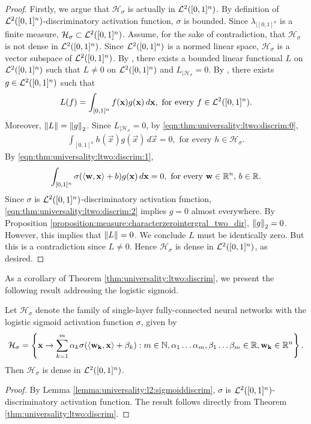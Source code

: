 \begin{proof}
Firstly, we argue that $\mathcal{H}_{\sigma}$ is actually in ${\mathcal {L}^2}([0,1]^n)$. By definition of ${\mathcal {L}^2}([0,1]^n)$-discriminatory activation function,
$\sigma$ is bounded. Since $\lambda_{|[0,1]^n}$ is a finite measure,  $\mathcal{H}_{\sigma} \subset {\mathcal {L}^2}([0,1]^n)$.
Assume, for the sake of contradiction, that  $\mathcal{H}_{\sigma}$ is not dense in ${\mathcal {L}^2}([0,1]^n)$. Since  ${\mathcal {L}^2}([0,1]^n)$ is a normed linear space, $\mathcal{H}_{\sigma}$ is a vector subspace of  ${\mathcal {L}^2}([0,1]^n)$.
By , there exists a bounded linear functional $L$ on ${\mathcal {L}^2}([0,1]^n)$ such that $L \neq 0$ on ${\mathcal {L}^2}([0,1]^n)$ and $L_{|\mathcal{H}_{\sigma}} = 0$. By , there exists $g \in {\mathcal {L}^2}([0,1]^n)$ such that \begin{align}
    \label{eqn:thm:universality:ltwo:discrim:0}
    L (f) = \int_{[0,1]^n} f(\mathbf{x}) g(\mathbf{x}) \, d\mathbf{x}, \text{ for every $f \in {\mathcal {L}^2}([0,1]^n)$}.
\end{align}
Moreover, $\left\lVert L\right\rVert = \left\lVert g\right\rVert_2$. Since $L_{|\mathcal{H}_{\sigma}} = 0$, by \ref{eqn:thm:universality:ltwo:discrim:0},
\begin{align}
     \label{eqn:thm:universality:ltwo:discrim:1}
     \int_{[0,1]^n} h(\vec{x}) g(\vec{x}) \, d\vec{x} = 0, \text{ for every $h \in \mathcal{H}_\sigma$}.
\end{align}
By \ref{eqn:thm:universality:ltwo:discrim:1}, 
\begin{align}
     \label{eqn:thm:universality:ltwo:discrim:2}
     \int_{[0,1]^n} \sigma(\langle \mathbf{w}, \mathbf{x} \rangle + b) g(\mathbf{x}) \, d\mathbf{x} = 0, \text{ for every $\mathbf{w} \in {\mathbb R}^n$, $b \in {\mathbb R}$}.
\end{align}
Since $\sigma$ is ${\mathcal {L}^2}([0,1]^n)$-discriminatory activation function, \ref{eqn:thm:universality:ltwo:discrim:2} implies $g = 0$ almost everywhere.
By Proposition \ref{proposition:measure:characterzerointergral_two_dir}, $\left\lVert g\right\rVert_2 = 0$. However, this implies that $\left\lVert L\right\rVert = 0$. We conclude $L$ must be identically zero. But this is a contradiction since $L \neq 0$. Hence $\mathcal{H}_{\sigma}$ is dense in ${\mathcal {L}^2}([0,1]^n)$, as desired.
\end{proof}
As a corollary of Theorem \ref{thm:universality:ltwo:discrim}, we present the following result addressing the logistic sigmoid.
\begin{corollary}
\label{thm:universality:ltwo:sigmoidal}
Let $\mathcal{H}_{\sigma}$ denote the family of single-layer fully-connected neural networks with the logistic sigmoid activation function $\sigma$, given by \begin{align*}
\mathcal{H}_{\sigma} = \left \{ \mathbf{x} \to \sum_{k=1}^{m} \alpha_k \sigma{\left (\langle \mathbf{w_k}, \mathbf{x} \rangle + \beta_k \right)} : m \in {\mathbb N}, \alpha_1 \ldots \alpha_m, \beta_1 \ldots \beta_m \in {\mathbb R}, \mathbf{w_k} \in {\mathbb R}^n \right \}.
\end{align*}
Then $\mathcal{H}_{\sigma}$ is dense in ${\mathcal {L}^2}([0,1]^n)$.
\end{corollary}
\begin{proof}
By Lemma \ref{lemma:universality:l2:sigmoiddiscrim}, $\sigma$ is ${\mathcal {L}^2}([0,1]^n)$-discriminatory activation function. The result follows directly from Theorem \ref{thm:universality:ltwo:discrim}.
\end{proof}